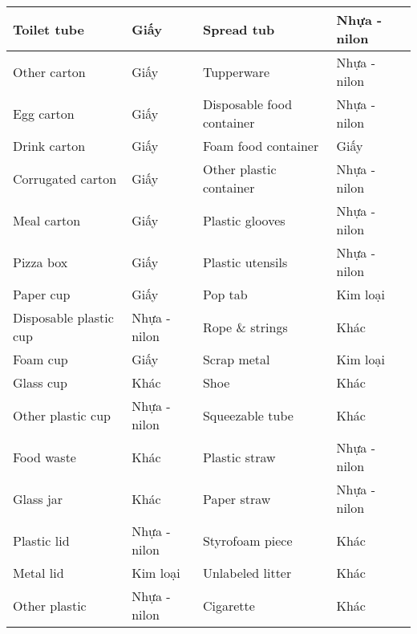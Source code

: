 \documentclass[../the.tex]{subfiles}
\begin{document}
\begin{table}[!h]
\begin{threeparttable}
\begin{tabular}{ll|ll}
			Toilet tube            & Giấy                                 & Spread tub                & Nhựa - nilon \\ \hline
			Other carton           & Giấy                                 & Tupperware                & Nhựa - nilon \\ \hline
			Egg carton             & Giấy                                 & Disposable food container & Nhựa - nilon \\ \hline
			Drink carton           & Giấy                                 & Foam food container       & Giấy         \\ \hline
			Corrugated carton      & Giấy                                 & Other plastic container   & Nhựa - nilon \\ \hline
			Meal carton            & Giấy                                 & Plastic glooves           & Nhựa - nilon \\ \hline
			Pizza box              & Giấy                                 & Plastic utensils          & Nhựa - nilon \\ \hline
			Paper cup              & Giấy                                 & Pop tab                   & Kim loại     \\ \hline
			Disposable plastic cup & Nhựa - nilon                         & Rope \& strings           & Khác         \\ \hline
			Foam cup               & Giấy                                 & Scrap metal               & Kim loại     \\ \hline
			Glass cup              & Khác                                 & Shoe                      & Khác         \\ \hline
			Other plastic cup      & Nhựa - nilon                         & Squeezable tube           & Khác         \\ \hline
			Food waste             & Khác                                 & Plastic straw             & Nhựa - nilon \\ \hline
			Glass jar              & Khác                                 & Paper straw               & Nhựa - nilon \\ \hline
			Plastic lid            & Nhựa - nilon                         & Styrofoam piece           & Khác         \\ \hline
			Metal lid              & Kim loại                             & Unlabeled litter          & Khác         \\ \hline
			Other plastic          & Nhựa - nilon                         & Cigarette                 & Khác         \\ \hline
		\end{tabular}
	\label{tab:taco_map}
	\end{threeparttable}
\end{table}
\end{document}
